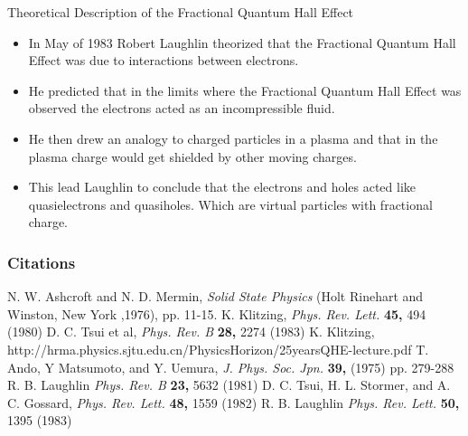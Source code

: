 \documentclass{beamer}
\begin{document}
\begin{frame}
\begin{block}
{Theoretical Description of the Fractional Quantum Hall Effect}
\begin{itemize}
\item In May of 1983 Robert Laughlin theorized that the Fractional Quantum Hall Effect was due to interactions between electrons. 
\item He predicted that in the limits where the Fractional Quantum Hall Effect was observed the electrons acted as an incompressible fluid.
\item He then drew an analogy to charged particles in a plasma and that in the plasma charge would get shielded by other moving charges.
\item This lead Laughlin to conclude that the electrons and holes acted like quasielectrons and quasiholes. Which are virtual particles with fractional charge.
\end{itemize}
\end{block}
\end{frame}
 
\begin{frame}
\frametitle{Citations}
\footnotesize{
\begin{thebibliography}{99}
  N. W. Ashcroft and N. D. Mermin, \emph{Solid State Physics} (Holt Rinehart and Winston, New York ,1976), pp. 11-15.
  K. Klitzing, \emph{Phys. Rev. Lett.} \textbf{45,} 494 (1980)
  D. C. Tsui et al, \emph{Phys. Rev. B} \textbf{28,} 2274 (1983)
  K. Klitzing, http://hrma.physics.sjtu.edu.cn/PhysicsHorizon/25yearsQHE-lecture.pdf
 T. Ando, Y Matsumoto, and Y. Uemura, \emph{J. Phys. Soc. Jpn.} \textbf{39,} (1975) pp. 279-288
 R. B. Laughlin \emph{Phys. Rev. B} \textbf{23,} 5632 (1981)
 D. C. Tsui, H. L. Stormer, and A. C. Gossard, \emph{Phys. Rev. Lett.} \textbf{48,} 1559 (1982)
 R. B. Laughlin \emph{Phys. Rev. Lett.} \textbf{50,} 1395 (1983)
\end{thebibliography}
}
\end{frame}
 
\end{document}
